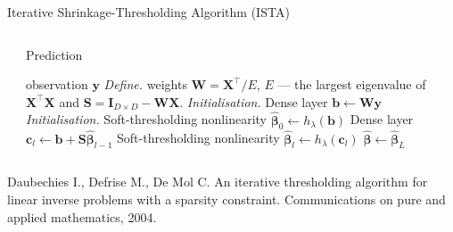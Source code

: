 \documentclass[9pt]{beamer}
\begin{document}
\begin{frame}{Iterative Shrinkage-Thresholding Algorithm (ISTA)}
\begin{columns}
\begin{column}{0.4\textwidth}
    \end{column}
    \begin{column}{0.6\textwidth}
    \begin{block}{Prediction}
    \begin{algorithmic}[1]
      \REQUIRE observation $\mathbf{y}$
      \STATE \textit{Define.} weights $\mathbf{W} = \mathbf{X}^\top/E$, $E$ --- the largest eigenvalue of $\mathbf{X}^\top\mathbf{X}$ and $\mathbf{S} = \mathbf{I}_{D\times D} - \mathbf{W}\mathbf{X}$.
      \STATE \textit{Initialisation.} Dense layer $\mathbf{b} \gets \mathbf{W}\mathbf{y}$
      \STATE \textit{Initialisation.} Soft-thresholding nonlinearity $\widehat{\boldsymbol\beta}_0 \gets h_\lambda(\mathbf{b})$
      \REPEAT
      \STATE Dense layer $\mathbf{c}_l \gets \mathbf{b} + \mathbf{S}\widehat{\boldsymbol\beta}_{l-1}$
      \STATE Soft-thresholding nonlinearity $\widehat{\boldsymbol\beta}_{l} \gets h_\lambda(\mathbf{c}_l)$
      \RETURN $\widehat{\boldsymbol\beta} \gets \widehat{\boldsymbol\beta}_{L}$
    \end{algorithmic}
    \end{block}
        \end{column}
      \end{columns}
      \footnotesize{Daubechies I., Defrise M., De Mol C. An iterative thresholding algorithm for linear inverse problems with a sparsity constraint. Communications on pure and applied mathematics, 2004.}
\end{frame}
%
\end{document}
